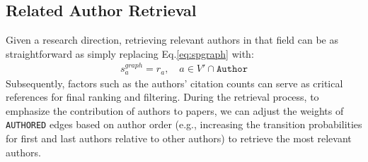 \documentclass{llmxive}
\begin{document}
\subsection{Related Author Retrieval}
Given a research direction, retrieving relevant authors in that field can be as straightforward as simply replacing Eq.\ref{eq:spgraph} with:
\begin{align}
    s_a^{graph} = r_a, \quad a \in V' \cap \texttt{Author}
\end{align}
Subsequently, factors such as the authors' citation counts can serve as critical references for final ranking and filtering.
During the retrieval process, to emphasize the contribution of authors to papers, we can adjust the weights of \texttt{AUTHORED} edges based on author order (e.g., increasing the transition probabilities for first and last authors relative to other authors) to retrieve the most relevant authors.
\end{document}
